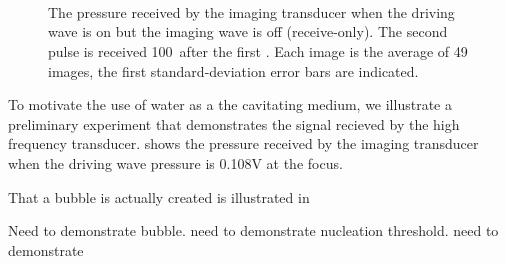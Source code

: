 \begin{figure}[t]%
  \centering
  \subfloat[1st pulse - 100]{
    \label{fig:av:108:100_ex:first}
    }
 \quad
  \subfloat[2nd pulse - 100]{
    \label{fig:av:108:100_ex:second}
    }\\
 \subfloat[1st pulse - 12000]{
    \label{fig:av:108:12000_ex:first}
    }
 \quad
  \subfloat[2nd pulse - 12000]{
    \label{fig:av:108:12000_ex:second}
    }\\
  \subfloat[2nd pulse - 12000]{
    \label{fig:av:108:12000_ex:sub}
    }\\
  \caption{
    The pressure received  by the imaging transducer when the driving wave is on but the imaging wave is off (receive-only).
    The second pulse  is received \unit{100}\micro\second\ after the first .
    Each image is the average of 49 images, the first standard-deviation error bars are indicated.
  }
  \label{fig:av:108:100_ex}
\end{figure}




To motivate the use of water as a the cavitating medium, 
we illustrate a preliminary experiment that demonstrates the signal recieved by the high frequency transducer.
 shows the pressure received by the imaging transducer when the driving wave pressure is 0.108V at the focus.

That a bubble is actually created is illustrated in 

Need to demonstrate bubble.
need to demonstrate nucleation threshold.
need to demonstrate 

